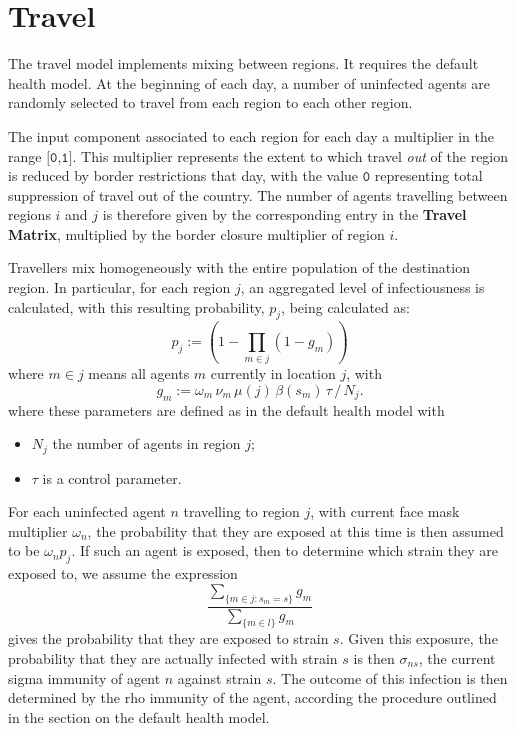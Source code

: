 \documentclass[10pt,letterpaper]{article}
\begin{document}
\section{Travel}

The travel model implements mixing between regions. It requires the default health model. At the beginning of each day, a number of uninfected agents are randomly selected to travel from each region to each other region.

The input component associated to each region for each day a multiplier in the range $\texttt{[0,1]}.$ This multiplier represents the extent to which travel \textit{out} of the region is reduced by border restrictions that day, with the value $\texttt{0}$ representing total suppression of travel out of the country. The number of agents travelling between regions $i$ and $j$ is therefore given by the corresponding entry in the \textbf{Travel Matrix}, multiplied by the border closure multiplier of region $i$.

Travellers mix homogeneously with the entire population of the destination region. In particular, for each region $j$, an aggregated level of infectiousness is calculated, with this resulting probability, $p_j$, being calculated as:
\begin{equation*}
p_j := \left(1 - \prod_{m \in j} (1 - g_m)\right)
\end{equation*}
where $m \in j$ means all agents $m$ currently in location $j$, with
\begin{equation*}
g_m  := \omega_m\, \nu_m\, \mu(j)\, \beta(s_m)\, \tau\, /\, N_j.
\end{equation*}
where these parameters are defined as in the default health model with
\begin{itemize}
\item $N_j$ the number of agents in region $j$;
\item $\tau$ is a control parameter.
\end{itemize}
For each uninfected agent $n$ travelling to region $j$, with current face mask multiplier $\omega_n$, the probability that they are exposed at this time is then assumed to be $\omega_n p_j$. If such an agent is exposed, then to determine which strain they are exposed to, we assume the expression
\begin{equation*}
\frac{\sum_{\{m \in j: s_m = s\}} g_m}{\sum_{\{m \in l\}} g_m}
\end{equation*}
gives the probability that they are exposed to strain $s$. Given this exposure, the probability that they are actually infected with strain $s$ is then $\sigma_{ns}$, the current sigma immunity of agent $n$ against strain $s$. The outcome of this infection is then determined by the rho immunity of the agent, according the procedure outlined in the section on the default health model.
\end{document}
